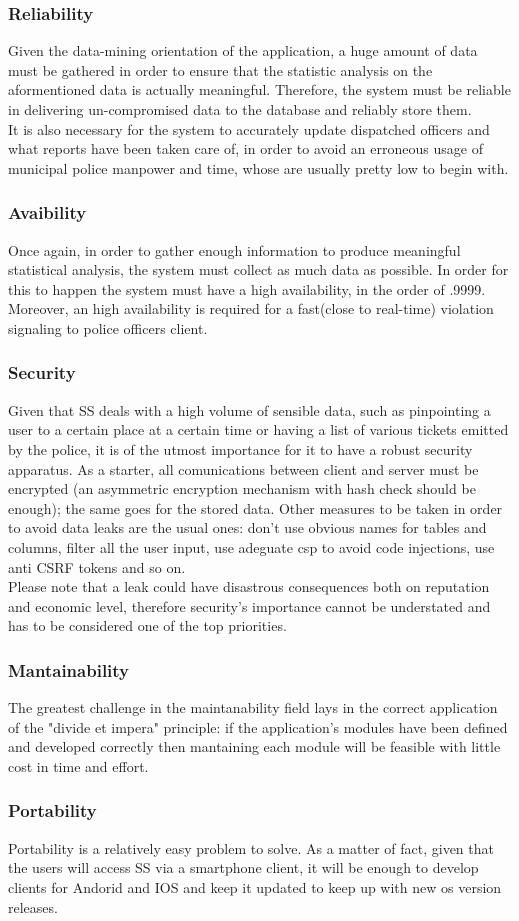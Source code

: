 	\subsubsection{Reliability}
	Given the data-mining orientation of the application, a huge amount of data must be gathered in order to ensure that the statistic analysis on the aformentioned data is actually meaningful. Therefore, the system must be reliable in delivering un-compromised data to the database and reliably store them.\\
	It is also necessary for the system to accurately update dispatched officers and what reports have been taken care of, in order to avoid an erroneous usage of municipal police manpower and time, whose are usually pretty low to begin with.
	\subsubsection{Avaibility}
	Once again, in order to gather enough information to produce meaningful statistical analysis, the system must collect as much data as possible. In order for this to happen the system must have a high availability, in the order of .9999. Moreover, an high availability is required for a fast(close to real-time) violation signaling to police officers client.
	\subsubsection{Security}
	Given that SS deals with a high volume of sensible data, such as pinpointing a user to a certain place at a certain time or having a list of various tickets emitted by the police, it is of the utmost importance for it to have a robust security apparatus. As a starter, all comunications between client and server must be encrypted (an asymmetric encryption mechanism with hash check should be enough); the same goes for the stored data. Other measures to be taken in order to avoid data leaks are the usual ones: don't use obvious names for tables and columns, filter all the user input, use adeguate csp to avoid code injections, use anti CSRF tokens and so on.\\
	Please note that a leak could have disastrous consequences both on reputation and economic level, therefore security's importance cannot be understated and has to be considered one of the top priorities. 
	\subsubsection{Mantainability}
	The greatest challenge in the maintanability field lays in the correct application of the "divide et impera" principle: if the application's modules have been defined and developed correctly then mantaining each module will be feasible with little cost in time and effort.
	\subsubsection{Portability}
	Portability is a relatively easy problem to solve. As a matter of fact, given that the users will access SS via a smartphone client, it will be enough to develop clients for Andorid and IOS and keep it updated to keep up with new os version releases. 

